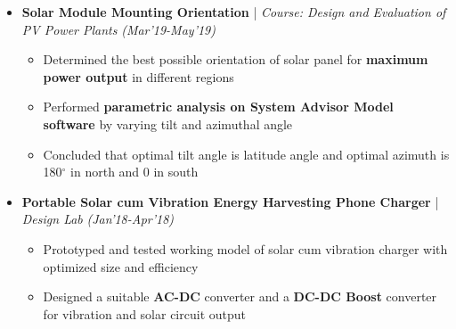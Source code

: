 \documentclass[a4paper, 10pt]{article}
\newcommand{\isep}{-2 pt}
\begin{document}
\begin{itemize} \itemsep \isep 
\vspace{-0.01cm}
\item \textbf{\large Solar Module Mounting Orientation} | \textit{Course: Design and Evaluation of PV Power Plants} \hfill \emph{(Mar'19-May'19)} \\
    \vspace{2pt}
	\begin{itemize}\itemsep \isep
	\vspace{-0.70cm}
 \item Determined the best possible orientation of solar panel for \textbf{maximum power output} in different regions
\item Performed \textbf{parametric analysis on System Advisor Model software} by varying tilt and azimuthal angle%
\item Concluded that optimal tilt angle is latitude angle and optimal azimuth is 180$^{\circ}$ in north and 0 in south
 	\end{itemize}
\vspace{-0.18cm}

\item \textbf{\large Portable Solar cum Vibration Energy Harvesting Phone Charger} |  \textit{Design Lab} \hfill \emph{(Jan'18-Apr'18)} \\
    \vspace{2pt}
\begin{itemize}\itemsep \isep
	\vspace{-0.70cm}
			\item Prototyped and tested working model of solar cum vibration charger with optimized size and efficiency
\item Designed a suitable \textbf{AC-DC} converter and a \textbf{DC-DC Boost} converter for vibration and solar circuit output
\end{itemize}
\vspace{-0.18cm}


\end{itemize}
\end{document}
